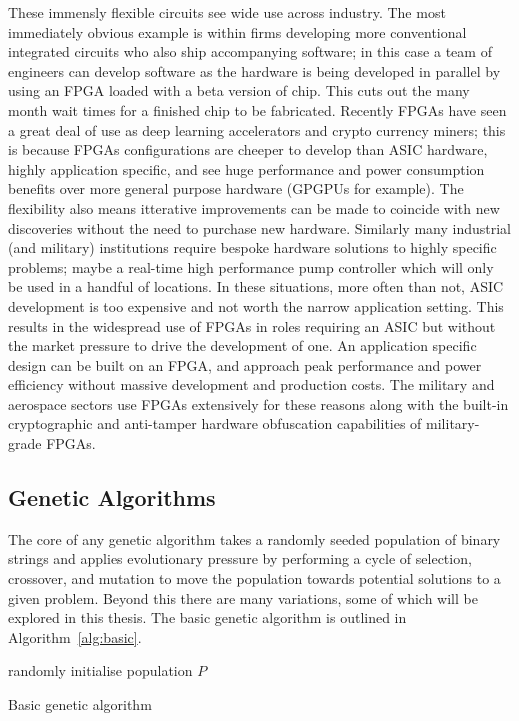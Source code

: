These immensly flexible circuits see wide use across industry. The most immediately
obvious example is
within firms developing more conventional integrated circuits who also ship accompanying
software; in this case a team of engineers can develop software
as the hardware is being developed in parallel by using an FPGA loaded with a beta version
of chip. This cuts out the many month wait times for a finished chip to be fabricated.
Recently FPGAs have seen a great deal of use as deep learning accelerators and crypto
currency miners; this is because FPGAs
configurations are cheeper to develop than ASIC hardware, highly application specific,
and see huge performance and power consumption benefits over more general purpose
hardware (GPGPUs for example). The flexibility also means itterative improvements
can be made to coincide with new discoveries without the need to purchase new
hardware. Similarly many industrial (and military) institutions require
bespoke hardware solutions to highly specific problems; maybe a real-time high performance
pump controller which will only be used in a handful of locations. In these situations,
more often than not, ASIC
development is too expensive and not worth the narrow application setting. This results in
the widespread use of FPGAs
in roles requiring an ASIC but without the market pressure to drive the development
of one.
An application specific design can be built on an FPGA, and approach peak performance and power
efficiency without massive development and production costs.
The military and aerospace sectors use FPGAs extensively for these reasons along with
the built-in cryptographic and anti-tamper hardware obfuscation capabilities of
military-grade FPGAs.

\subsection{Genetic Algorithms}
The core of any genetic algorithm takes a randomly seeded population of binary strings
and applies
evolutionary pressure by performing a cycle of selection, crossover, and mutation
to move the population towards potential solutions to a given problem. Beyond this there are many
variations, some of which will be explored in this thesis. The basic genetic algorithm is
outlined in Algorithm~\ref{alg:basic}.

\begin{algorithm}[t]
	randomly initialise population $P$\;
	\caption{Basic genetic algorithm}
	\label{alg:basic}
\end{algorithm}

